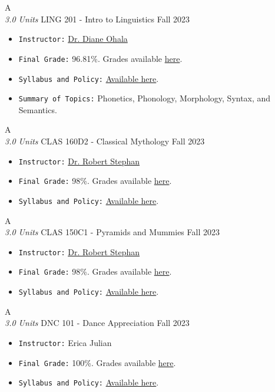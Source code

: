 \cventry
{A \\ \small{\textit{3.0 Units}}}
{LING 201 - Intro to Linguistics}
{Fall 2023}
{}
{}
{
  \begin{itemize}
    \item \texttt{Instructor:} \href{https://profiles.arizona.edu/person/ohalad}{Dr. Diane Ohala}
    \item \texttt{Final Grade:} 96.81\%. Grades available \href{https://mhrezaei.com/assets/cv/courses/Fall2023/LING201/Grades.pdf}{here}.
    \item \texttt{Syllabus and Policy:} \href{https://mhrezaei.com/assets/cv/courses/Fall2023/LING201/Syllabus.pdf}{Available here}.
    \item \texttt{Summary of Topics:} Phonetics, Phonology, Morphology, Syntax, and Semantics.
  \end{itemize}
}

\cventry
{A \\ \small{\textit{3.0 Units}}}
{CLAS 160D2 - Classical Mythology}
{Fall 2023}
{}
{}
{
  \begin{itemize}
    \item \texttt{Instructor:} \href{https://classics.arizona.edu/people/rstephan}{Dr. Robert Stephan}
    \item \texttt{Final Grade:} 98\%. Grades available \href{https://mhrezaei.com/assets/cv/courses/Fall2023/CLAS160D2/Grades.pdf}{here}.
    \item \texttt{Syllabus and Policy:} \href{https://mhrezaei.com/assets/cv/courses/Fall2023/CLAS160D2/Syllabus.pdf}{Available here}.
  \end{itemize}
}

\cventry
{A \\ \small{\textit{3.0 Units}}}
{CLAS 150C1 - Pyramids and Mummies}
{Fall 2023}
{}
{}
{
  \begin{itemize}
    \item \texttt{Instructor:} \href{https://classics.arizona.edu/people/rstephan}{Dr. Robert Stephan}
    \item \texttt{Final Grade:} 98\%. Grades available \href{https://mhrezaei.com/assets/cv/courses/Fall2023/CLAS150C1/Grades.pdf}{here}.
    \item \texttt{Syllabus and Policy:} \href{https://mhrezaei.com/assets/cv/courses/Fall2023/CLAS150C1/Syllabus.pdf}{Available here}.
  \end{itemize}
}

\cventry
{A \\ \small{\textit{3.0 Units}}}
{DNC 101 - Dance Appreciation}
{Fall 2023}
{}
{}
{
  \begin{itemize}
    \item \texttt{Instructor:} Erica Julian
    \item \texttt{Final Grade:} 100\%. Grades available \href{https://mhrezaei.com/assets/cv/courses/Fall2023/DNC101/Grades.pdf}{here}.
    \item \texttt{Syllabus and Policy:} \href{https://mhrezaei.com/assets/cv/courses/Fall2023/DNC101/Syllabus.pdf}{Available here}.
  \end{itemize}
}

